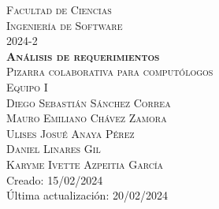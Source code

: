 \begin{center}
\begin{minipage}{0.29\textwidth}
    \end{minipage}
    \vspace{5mm}					
    
    \textsc{\noindent \LARGE Facultad de Ciencias}\\[20mm]
    
    \textsc{\LARGE   Ingeniería de Software \\[5mm]
                    \LARGE 2024-2}      \\[20mm]
    
    \textsc{\textbf{\huge   Análisis de requerimientos}}\\[5mm]
    \textsc{\LARGE  Pizarra colaborativa para computólogos}\\[20mm]

    \LARGE
    \textsc{Equipo I}\\[5mm]
    \Large 
    \textsc{Diego Sebastián Sánchez Correa}\\[2mm]
    \textsc{Mauro Emiliano Chávez Zamora}\\[2mm]
    \textsc{Ulises Josué Anaya Pérez}\\[2mm]
    \textsc{Daniel Linares Gil} \\[2mm]
    \textsc{Karyme Ivette Azpeitia García}
    \\[20mm]

    \large Creado: 15/02/2024\\[2mm]
    \large Última actualización: 20/02/2024\\
    
\end{center}	
\newpage  
